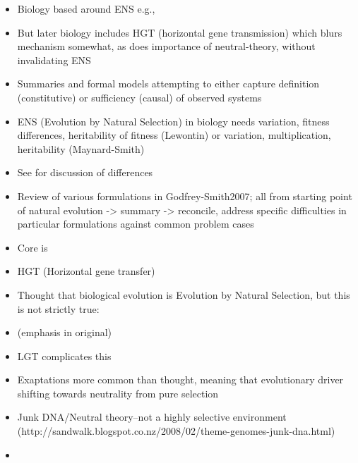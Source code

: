\begin{itemize}
	\item
	Biology based around ENS e.g., 
	\item
	But later biology includes HGT (horizontal gene transmission) which
	blurs mechanism somewhat, as does importance of neutral-theory,
	without invalidating ENS
	\item
	Summaries and formal models attempting to either capture definition
	(constitutive) or sufficiency (causal) of observed systems
	\item
	ENS (Evolution by Natural Selection) in biology needs variation,
	fitness differences, heritability of fitness (Lewontin) or variation,
	multiplication, heritability (Maynard-Smith)
	\item
	See \autocite{Griesemer2001} for discussion of differences
	\item
	Review of various formulations in Godfrey-Smith2007; all from starting
	point of natural evolution -\textgreater{} summary -\textgreater{}
	reconcile, address specific difficulties in particular formulations
	against common problem cases
	\item
	Core is 
	\item
	HGT (Horizontal gene transfer)
	\item
	Thought that biological evolution is Evolution by Natural Selection,
	but this is not strictly true:
	\item
	(emphasis in original)
	\item
	LGT complicates this
	\item
	Exaptations more common than thought, meaning that evolutionary driver
	shifting towards neutrality from pure selection \autocite{Barve2013}
	\item
	Junk DNA/Neutral theory--not a highly selective environment
	(http://sandwalk.blogspot.co.nz/2008/02/theme-genomes-junk-dna.html)
	\item

\end{itemize}
